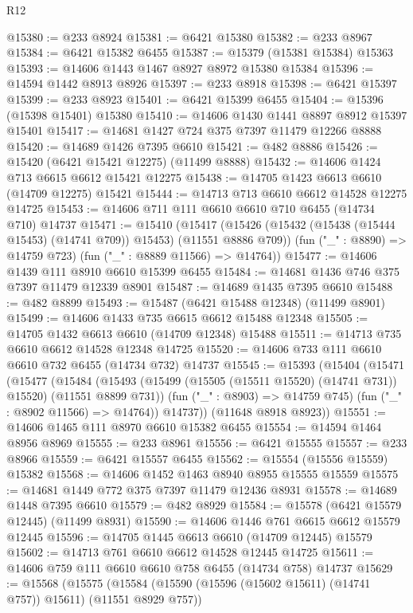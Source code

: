 \begin{lexlean}{R12}
\begin{coremodule}
@15380 := @233 @8924
@15381 := @6421 @15380
@15382 := @233 @8967
@15384 := @6421 @15382 @6455
@15387 := @15379 (@15381 @15384) @15363
@15393 := @14606 @1443 @1467 @8927 @8972 @15380 @15384
@15396 := @14594 @1442 @8913 @8926
@15397 := @233 @8918
@15398 := @6421 @15397
@15399 := @233 @8923
@15401 := @6421 @15399 @6455
@15404 := @15396 (@15398 @15401) @15380
@15410 := @14606 @1430 @1441 @8897 @8912 @15397 @15401
@15417 := @14681 @1427 @724 @375 @7397 @11479 @12266 @8888
@15420 := @14689 @1426 @7395 @6610
@15421 := @482 @8886
@15426 := @15420 (@6421 @15421 @12275) (@11499 @8888)
@15432 := @14606 @1424 @713 @6615 @6612 @15421 @12275
@15438 := @14705 @1423 @6613 @6610 (@14709 @12275) @15421
@15444 := @14713 @713 @6610 @6612 @14528 @12275 @14725
@15453 := @14606 @711 @111 @6610 @6610 @710 @6455 (@14734 @710) @14737
@15471 := @15410
    (@15417
      (@15426 (@15432 (@15438 (@15444 @15453) (@14741 @709)) @15453) (@11551 @8886 @709))
      (fun ("_" : @8890) => @14759 @723)
      (fun ("_" : @8889 @11566) => @14764))
@15477 := @14606 @1439 @111 @8910 @6610 @15399 @6455
@15484 := @14681 @1436 @746 @375 @7397 @11479 @12339 @8901
@15487 := @14689 @1435 @7395 @6610
@15488 := @482 @8899
@15493 := @15487 (@6421 @15488 @12348) (@11499 @8901)
@15499 := @14606 @1433 @735 @6615 @6612 @15488 @12348
@15505 := @14705 @1432 @6613 @6610 (@14709 @12348) @15488
@15511 := @14713 @735 @6610 @6612 @14528 @12348 @14725
@15520 := @14606 @733 @111 @6610 @6610 @732 @6455 (@14734 @732) @14737
@15545 := @15393
    (@15404
      (@15471
        (@15477
          (@15484
            (@15493 (@15499 (@15505 (@15511 @15520) (@14741 @731)) @15520) (@11551 @8899 @731))
            (fun ("_" : @8903) => @14759 @745)
            (fun ("_" : @8902 @11566) => @14764))
          @14737))
      (@11648 @8918 @8923))
@15551 := @14606 @1465 @111 @8970 @6610 @15382 @6455
@15554 := @14594 @1464 @8956 @8969
@15555 := @233 @8961
@15556 := @6421 @15555
@15557 := @233 @8966
@15559 := @6421 @15557 @6455
@15562 := @15554 (@15556 @15559) @15382
@15568 := @14606 @1452 @1463 @8940 @8955 @15555 @15559
@15575 := @14681 @1449 @772 @375 @7397 @11479 @12436 @8931
@15578 := @14689 @1448 @7395 @6610
@15579 := @482 @8929
@15584 := @15578 (@6421 @15579 @12445) (@11499 @8931)
@15590 := @14606 @1446 @761 @6615 @6612 @15579 @12445
@15596 := @14705 @1445 @6613 @6610 (@14709 @12445) @15579
@15602 := @14713 @761 @6610 @6612 @14528 @12445 @14725
@15611 := @14606 @759 @111 @6610 @6610 @758 @6455 (@14734 @758) @14737
@15629 := @15568
    (@15575
      (@15584 (@15590 (@15596 (@15602 @15611) (@14741 @757)) @15611) (@11551 @8929 @757))

\end{coremodule}
\end{lexlean}
